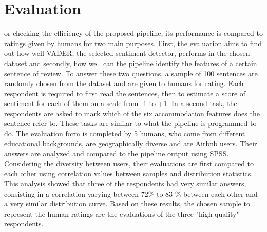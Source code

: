 %
%


\let\textcircled=\pgftextcircled
\chapter{Evaluation}
\label{chap:eva}

or checking the efficiency of the proposed pipeline, its performance is compared to ratings given by humans for two main purposes. First, the evaluation aims to find out how well VADER, the selected sentiment detector, performs in the chosen dataset and secondly, how well can the pipeline identify the features of a certain sentence of review. To answer these two questions, a sample of 100 sentences are randomly chosen from the dataset and are given to humans for rating. Each respondent is required to first read the sentences, then to estimate a score of sentiment for each of them on a scale from -1 to +1. In a second task, the respondents are asked to mark which of the six accommodation features does the sentence refer to. These tasks are similar to what the pipeline is programmed to do. 
The evaluation form is completed by 5 humans, who come from different educational backgrounds, are geographically diverse and are Airbnb users. Their answers are analyzed and compared to the pipeline output using SPSS. Considering the diversity between users, their evaluations are first compared to each other using correlation values between samples and distribution statistics. This analysis showed that three of the respondents had very similar answers, consisting in a correlation varying between 72\% to 83 \% between each other and a very similar distribution curve. 
Based on these results, the chosen sample to represent the human ratings are the evaluations of the three "high quality" respondents.


